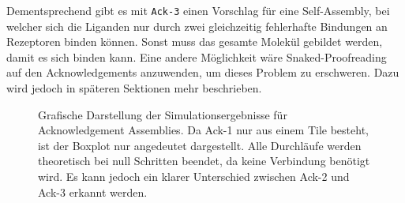 Dementsprechend gibt es mit \texttt{Ack-3} einen Vorschlag für eine Self-Assembly, bei welcher sich die Liganden nur durch zwei gleichzeitig fehlerhafte Bindungen an Rezeptoren binden können. Sonst muss das gesamte Molekül gebildet werden, damit es sich binden kann. Eine andere Möglichkeit wäre Snaked-Proofreading auf den Acknowledgements anzuwenden, um dieses Problem zu erschweren. Dazu wird jedoch in späteren Sektionen mehr beschrieben.

\begin{figure}
    \centering 
    \caption[Simulationsergebnisse für Acknowledgement Assemblies]{Grafische Darstellung der Simulationsergebnisse für Acknowledgement Assemblies. Da Ack-1 nur aus einem Tile besteht, ist der Boxplot nur angedeutet dargestellt. Alle Durchläufe werden theoretisch bei null Schritten beendet, da keine Verbindung benötigt wird. Es kann jedoch ein klarer Unterschied zwischen Ack-2 und Ack-3 erkannt werden.}
    \label{fig:ack_simulationen}
\end{figure}

